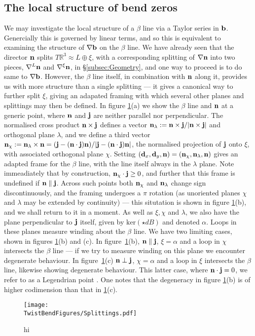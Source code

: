 \subsection{The local structure of bend zeros}
We may investigate the local structure of a $\beta$ line via a Taylor series in $\mathbf{b}$. Genercially this is governed by linear terms, and so this is equivalent to examining the structure of $\nabla \mathbf{b}$ on the $\beta$ line. We have already seen that the director $\mathbf{n}$ splits $T \mathbb{R}^3\approx L \oplus \xi$, with a corresponding splitting of $\nabla \mathbf{n}$ into two pieces, $\nabla^L \mathbf{n} $ and $\nabla^\xi \mathbf{n}$, in \S\ref{subsec:Geometry}, and one way to proceed is to do same to $\nabla \mathbf{b}$. However, the $\beta$ line itself, in combination with $\mathbf{n}$ along it, provides us with more structure than a single splitting --- it gives a canonical way to further split $\xi$, giving an adapated framing with which several other planes and splittings may then be defined. In figure \ref{fig:Splittings}(a) we show the $\beta$ line and $\mathbf{n}$ at a generic point, where $\mathbf{n}$ and $\mathbf{j}$ are neither parallel nor perpendicular. The normalised cross product $\mathbf{n} \times \mathbf{j}$ defines a vector $\mathbf{n}_\lambda := \mathbf{n} \times \mathbf{j}/| \mathbf{n} \times \mathbf{j}|$ and orthogonal plane $\lambda$, and we define a third vector $\mathbf{n}_\chi := \mathbf{n}_\lambda \times \mathbf{n} = (\mathbf{j} - (\mathbf{n}\cdot \mathbf{j})\mathbf{n})/|\mathbf{j} - (\mathbf{n}\cdot \mathbf{j})\mathbf{n}|$, the normalised projection of $\mathbf{j}$ onto $\xi$, with associated orthogonal plane $\chi$. Setting $(\mathbf{d}_x, \mathbf{d}_y, \mathbf{n}) = (\mathbf{n}_\chi, \mathbf{n}_\lambda, \mathbf{n})$ gives an adapted frame for the $\beta$ line, with the line itself always in the $\lambda$ plane. Note immeadiately that by construction, $\mathbf{n}_\chi \cdot \mathbf{j} \geq 0$, and further that this frame is undefined if $\mathbf{n} \parallel \mathbf{j}$. Across such points both $\mathbf{n}_\chi$ and $\mathbf{n}_\lambda$ change sign discontinuously, and the framing undergoes a $\pi$ rotation (as unoriented planes $\chi$ and $\lambda$ may be extended by continuity) --- this situtation is shown in figure  \ref{fig:Splittings}(b), and we shall return to it in a moment. As well as $\xi, \chi$ and $\lambda$, we also have the plane perpendicular to $\mathbf{j}$ itself, given by $\mathrm{ker}(\star dB)$ and denoted $\alpha$. Loops in these planes measure winding about the $\beta$ line. We have two limiting cases, shown in figures \ref{fig:Splittings}(b) and (c). In figure~\ref{fig:Splittings}(b), $\mathbf{n} \parallel \mathbf{j}$, $\xi = \alpha$ and a loop in $\chi$ intersects the $\beta$ line --- if we try to measure winding on this plane we encounter degenerate behaviour. In figure~\ref{fig:Splittings}(c) $\mathbf{n} \perp \mathbf{j}$, $\chi = \alpha$ and a loop in $\xi$  intersects the $\beta$ line, likewise showing degenerate behaviour. This latter case, where $\mathbf{n} \cdot \mathbf{j}= 0$, we refer to as a Legendrian point \citep{Geiges2009}. One notes that the degeneracy in figure \ref{fig:Splittings}(b) is of higher codimension than that in \ref{fig:Splittings}(c).
\begin{figure}[htbp]
    \centering
    \texttt{[image: \\TwistBendFigures/Splittings.pdf]}
    \caption{hi}
    \label{fig:Splittings}
\end{figure}

